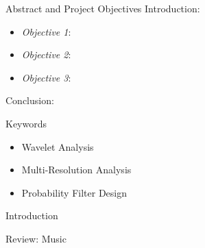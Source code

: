 


\setlength{\belowcaptionskip}{2ex}
\setlength\belowdisplayshortskip{2ex}
\begin{frame}[t]
\begin{columns}[t]
\begin{column}{\onecolwid} %
\begin{alertblock}{Abstract and Project Objectives}
Introduction:
\begin{itemize}
\item \textit{Objective 1}: 
\item \textit{Objective 2}: 
\item \textit{Objective 3}: 
\end{itemize}
Conclusion:
\end{alertblock}
\begin{block}{Keywords}
\begin{itemize}
\item Wavelet Analysis
\item Multi-Resolution Analysis
\item Probability Filter Design
\end{itemize}	
\end{block}
\begin{alertblock}{Introduction}
\end{alertblock}
\begin{alertblock}{Review: Music}


\end{alertblock}
\end{column}
\end{columns}
\end{frame}
